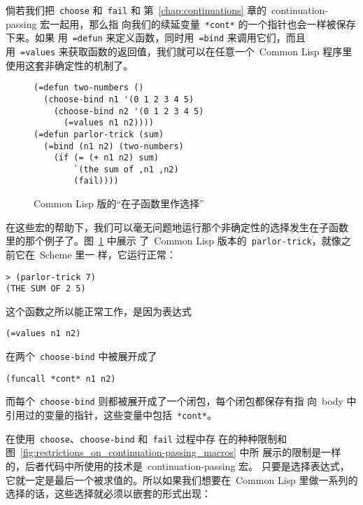 倘若我们把~\texttt{choose} 和~\texttt{fail} 和
第~\ref{chap:continuations} 章的~continuation-passing 宏一起用，那么指
向我们的续延变量~\texttt{*cont*} 的一个指针也会一样被保存下来。如果
用~\texttt{=defun} 来定义函数，同时用~\texttt{=bind} 来调用它们，而且
用~\texttt{=values} 来获取函数的返回值，我们就可以在任意一个~Common
Lisp 程序里使用这套非确定性的机制了。

\begin{figure}
\begin{lstlisting}
(=defun two-numbers ()
  (choose-bind n1 '(0 1 2 3 4 5)
    (choose-bind n2 '(0 1 2 3 4 5)
      (=values n1 n2))))
(=defun parlor-trick (sum)
  (=bind (n1 n2) (two-numbers)
    (if (= (+ n1 n2) sum)
        `(the sum of ,n1 ,n2)
        (fail))))
\end{lstlisting}
\caption{Common Lisp 版的``在子函数里作选择''}
\label{fig:common_lisp_choice_in_a_subroutine}
\end{figure}

在这些宏的帮助下，我们可以毫无问题地运行那个非确定性的选择发生在子函数
里的那个例子了。图~\ref{fig:common_lisp_choice_in_a_subroutine} 中展示
了~Common Lisp 版本的~\texttt{parlor-trick}，就像之前它在~Scheme 里一
样，它运行正常：
\begin{lstlisting}
> (parlor-trick 7)
(THE SUM OF 2 5)
\end{lstlisting}

这个函数之所以能正常工作，是因为表达式
\begin{lstlisting}
(=values n1 n2)
\end{lstlisting}

在两个~\texttt{choose-bind} 中被展开成了
\begin{lstlisting}
(funcall *cont* n1 n2)
\end{lstlisting}
而每个~\texttt{choose-bind} 则都被展开成了一个闭包，每个闭包都保存有指
向~body 中引用过的变量的指针，这些变量中包括~\texttt{*cont*}。

在使用~\texttt{choose}、\texttt{choose-bind} 和~\texttt{fail} 过程中存
在的种种限制和图~\ref{fig:restrictions_on_continuation-passing_macros} 中所
展示的限制是一样的，后者代码中所使用的技术是~continuation-passing 宏。
只要是选择表达式，它就一定是最后一个被求值的。所以如果我们想要在~Common
Lisp 里做一系列的选择的话，这些选择就必须以嵌套的形式出现：

